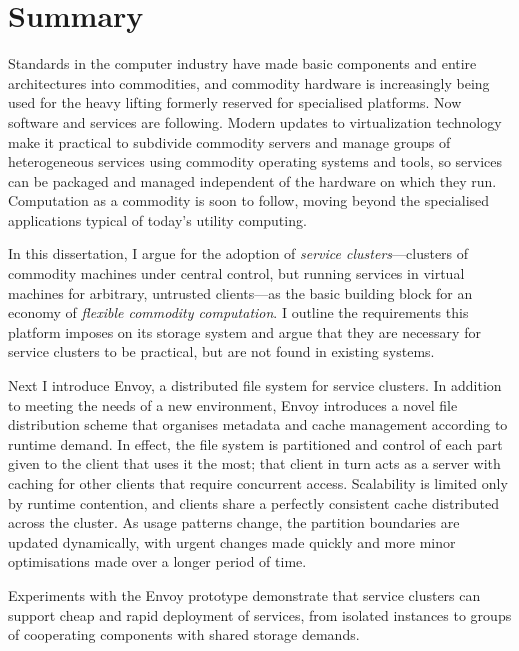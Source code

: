 

% 
% 
% 


\chapter*{Summary}


\noindent Standards in the computer industry have made basic components and entire architectures into commodities, and commodity hardware is increasingly being used for the heavy lifting formerly reserved for specialised platforms. Now software and services are following. Modern updates to virtualization technology make it practical to subdivide commodity servers and manage groups of heterogeneous services using commodity operating systems and tools, so services can be packaged and managed independent of the hardware on which they run. Computation as a commodity is soon to follow, moving beyond the specialised applications typical of today's utility computing.

In this dissertation, I argue for the adoption of \emph{service clusters}---clusters of commodity machines under central control, but running services in virtual machines for arbitrary, untrusted clients---as the basic building block for an economy of \emph{flexible commodity computation}. I outline the requirements this platform imposes on its storage system and argue that they are necessary for service clusters to be practical, but are not found in existing systems.

Next I introduce Envoy, a distributed file system for service clusters. In addition to meeting the needs of a new environment, Envoy introduces a novel file distribution scheme that organises metadata and cache management according to runtime demand. In effect, the file system is partitioned and control of each part given to the client that uses it the most; that client in turn acts as a server with caching for other clients that require concurrent access. Scalability is limited only by runtime contention, and clients share a perfectly consistent cache distributed across the cluster. As usage patterns change, the partition boundaries are updated dynamically, with urgent changes made quickly and more minor optimisations made over a longer period of time.

Experiments with the Envoy prototype demonstrate that service clusters can support cheap and rapid deployment of services, from isolated instances to groups of cooperating components with shared storage demands.